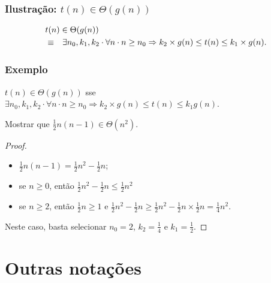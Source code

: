\documentclass{beamer}
\begin{document}
\begin{frame}
  \frametitle{Ilustração: $t(n) \in \Theta(g(n))$}
  \begin{center}
    
  \end{center}
\begin{eqnarray*}
\lefteqn{t(n) \in \Theta(g(n))} \\
& \equiv & \exists n_0, k_1, k_2 \cdot \forall n \cdot n \ge n_0 \Rightarrow k_2 \times g(n) \le t(n) \le k_1 \times g(n).
\end{eqnarray*}

\end{frame}

\begin{frame}
\frametitle{Exemplo}

\begin{definition}
$t(n) \in \Theta(g(n))$ sse $\exists n_0, k_1, k_2 \cdot \forall n \cdot n \ge n_0 \Rightarrow k_2 \times g(n) \le t(n) \le k_1 g(n)$.
\end{definition}

\begin{example}
Mostrar que $\frac{1}{2} n (n-1) \in \Theta(n^2)$.
\end{example}

\begin{proof}
  \begin{itemize}
    \item $\frac{1}{2} n (n-1) = \frac{1}{2}n^2 - \frac{1}{2}n$;
    \item se $n \ge 0$, então $\frac{1}{2}n^2 - \frac{1}{2}n \le \frac{1}{2}n^2$
    \item se $n \ge 2$, então $\frac{1}{2}n \ge 1$ e $\frac{1}{2}n^2 - \frac{1}{2}n \ge \frac{1}{2}n^2 - \frac{1}{2}n \times \frac{1}{2}n = \frac{1}{4}n^2$.
  \end{itemize}
  Neste caso, basta selecionar $n_0 = 2$, $k_2 = \frac{1}{4}$ 
  e $k_1 = \frac{1}{2}$.
\end{proof}
\end{frame}

\section{Outras notações}
\end{document}
